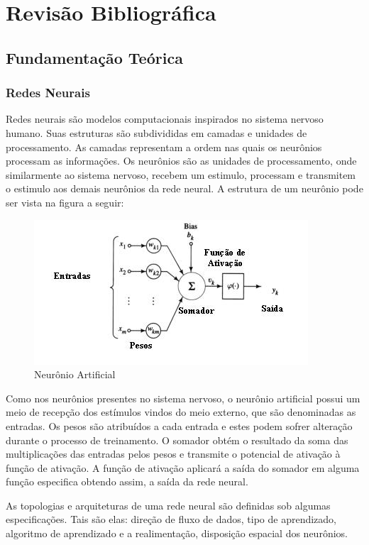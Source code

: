 \chapter{Revisão Bibliográfica} \label{cap2}
\section{Fundamentação Teórica}
\subsection{Redes Neurais}
Redes neurais são modelos computacionais inspirados no sistema nervoso humano. Suas estruturas são subdivididas em camadas e unidades de processamento. As camadas representam a ordem nas quais os neurônios processam as informações. Os neurônios são as unidades de processamento, onde similarmente ao sistema nervoso, recebem um estimulo, processam e transmitem o estimulo aos demais neurônios da rede neural. A estrutura de um neurônio pode ser vista na figura a seguir:
\begin{figure}[H]
	\centering
    \label{fig1}
    \vspace{3ex}%
	\includegraphics[scale=0.7]{pasta1_figuras/neuronio_artificial.jpg}
    \caption{Neurônio Artificial}
\end{figure}

Como nos neurônios presentes no sistema nervoso, o neurônio artificial possui um meio de recepção dos estímulos vindos do meio externo, que são denominadas as entradas. Os pesos são atribuídos a cada entrada e estes podem sofrer alteração durante o processo de treinamento. O somador obtém o resultado da soma das multiplicações das entradas pelos pesos e transmite o potencial de ativação à função de ativação. A função de ativação aplicará a saída do somador em alguma função especifica obtendo assim, a saída da rede neural.

As topologias e arquiteturas de uma rede neural são definidas sob algumas especificações. Tais são elas: direção de fluxo de dados, tipo de aprendizado, algoritmo de aprendizado e a realimentação, disposição espacial dos neurônios.

